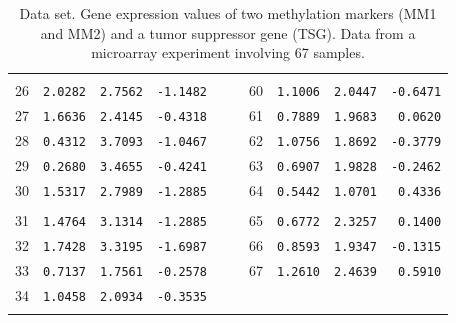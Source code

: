 \documentclass[a4paper]{article}
\theoremstyle{myexamplestyle}
\begin{document}
\begin{center}
\begin{table}[!h]
\begin{tabular}{rrrrrrrrrr}
\\
	&		&		&		&	&	&		&		&		&		
\\
26	&	\texttt{2.0282}	&	\texttt{2.7562}	&	\texttt{-1.1482} 	&	&	&	60	&	\texttt{1.1006}	&	\texttt{2.0447}	&	\texttt{-0.6471}	
\\
27	&	\texttt{1.6636}	&	\texttt{2.4145}	&	\texttt{-0.4318} 	&	&	&	61	&	\texttt{0.7889}	&	\texttt{1.9683}	&	\texttt{0.0620}
\\
28	&	\texttt{0.4312}	&	\texttt{3.7093}	&	\texttt{-1.0467} 	&	&	&	62	&	\texttt{1.0756}	&	\texttt{1.8692}	&	\texttt{-0.3779}
\\
29	&	\texttt{0.2680}	&	\texttt{3.4655}	&	\texttt{-0.4241} 	&	&	&	63	&	\texttt{0.6907}	&	\texttt{1.9828}	&	\texttt{-0.2462}
\\
30	&	\texttt{1.5317}	&	\texttt{2.7989}	&	\texttt{-1.2885}	    &	&	&	64	&	\texttt{0.5442}	&	\texttt{1.0701}	&	\texttt{0.4336}
\\
	&		&		&		&	&	&		&		&		&		
\\
31	&	\texttt{1.4764}	&	\texttt{3.1314}	&	\texttt{-1.2885} 	&	&	&	65	&	\texttt{0.6772}	&	\texttt{2.3257}	&	\texttt{0.1400}
\\
32	&	\texttt{1.7428}	&	\texttt{3.3195}	&	\texttt{-1.6987} 	&	&	&	66	&	\texttt{0.8593}	&	\texttt{1.9347}	&	\texttt{-0.1315}
\\
33	&	\texttt{0.7137}	&	\texttt{1.7561}	&	\texttt{-0.2578}	    &	&	&	67	&	\texttt{1.2610}	&	\texttt{2.4639}	&	\texttt{0.5910}
\\
34	&	\texttt{1.0458}	&	\texttt{2.0934}	&	\texttt{-0.3535} 	&	&	&		&		&		&		\\	
\vspace{-0.3cm}
	&		&		&		&	&	&		&		&		&		\\
\hline
\end{tabular}
\hfill{}
\caption{Data set. Gene expression values of two methylation markers (MM1 and MM2) and a tumor suppressor gene (TSG). Data from a microarray experiment involving 67 samples.}
\label{tab.methTSGdata}
\end{table}
\end{center}



\newpage
\end{document}
